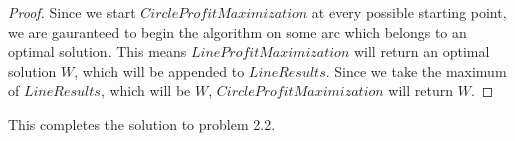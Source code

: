 \documentclass[psamsfonts]{amsart}
\newenvironment{sol}{{\bfseries Solution}}{\qedsymbol}
\theoremstyle{definition}
\theoremstyle{remark}
\numberwithin{equation}{section}
\begin{document}
\begin{sol}
\begin{proof}
Since we start $CircleProfitMaximization$ at every possible starting point, we are gauranteed to begin the algorithm on some arc which belongs to an optimal solution. This means $LineProfitMaximization$ will return an optimal solution $W$, which will be appended to $LineResults$. Since we take the maximum of $LineResults$, which will be $W$, $CircleProfitMaximization$ will return $W$.
\end{proof}

This completes the solution to problem 2.2.

\end{sol}
\end{document}
